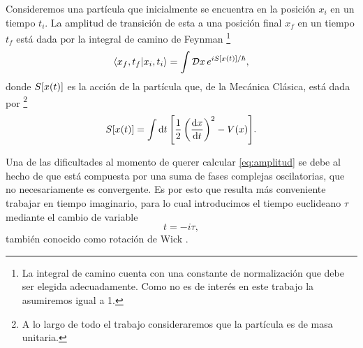 Consideremos una partícula que inicialmente se encuentra en la posición $x_i$ en un tiempo $t_i$. La amplitud de transición de esta a una posición final $x_f$ en un tiempo $t_f$ está dada por la integral de camino de Feynman \footnote{La integral de camino cuenta con una constante de normalización que debe ser elegida adecuadamente. Como no es de interés en este trabajo la asumiremos igual a 1.} \cite{feynman2010quantum}
\begin{equation}\label{eq:amplitud}
\bra{x_f, t_f}\ket{x_i, t_i} = \int \mathcal{D}x \, e^{iS\qty[x \qty(t)]/\hbar},
\end{equation}
donde $S\qty[x \qty(t)]$ es la acción de la partícula que, de la Mecánica Clásica, está dada por \footnote{A lo largo de todo el trabajo consideraremos que la partícula es de masa unitaria.}
\begin{equation}
S\qty[x \qty(t)] = \int \dd{t} \qty[\frac{1}{2} \left(\dv{x}{t}\right)^2 - V\qty(x)]. \label{eq:accion}
\end{equation}

Una de las dificultades al momento de querer calcular \eqref{eq:amplitud} se debe al hecho de que está compuesta por una suma de fases complejas oscilatorias, que no necesariamente es convergente. Es por esto que resulta más conveniente trabajar en tiempo imaginario, para lo cual introducimos el tiempo euclideano $\tau$ mediante el cambio de variable
\begin{equation} \label{eq:tiempo_im}
	t = -i\tau, 
\end{equation} 
también conocido como rotación de Wick \cite{das2006field}. %

